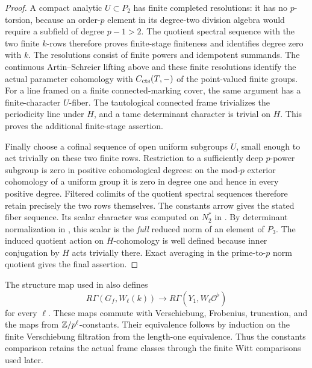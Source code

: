 \begin{proof}
A compact analytic $U\subset P_2$ has finite
completed resolutions: it has no $p$-torsion,
because an order-$p$ element in its degree-two
division algebra would require a subfield of
degree $p-1>2$.  The quotient spectral sequence
with the two finite $k$-rows therefore proves
finite-stage finiteness and identifies degree
zero with $k$.  The resolutions consist of
finite powers and idempotent summands.  The
continuous Artin--Schreier lifting above and
these finite resolutions identify the actual
parameter cohomology with $C_{\mathrm{cts}}(T,-)$ of
the point-valued finite groups.
For a line framed on a finite connected-marking
cover, the same argument has a finite-character
$U$-fiber.  The tautological connected frame
trivializes the periodicity line under $H$, and a
tame determinant character is trivial on $H$.
This proves the additional finite-stage assertion.

Finally choose a cofinal sequence of open uniform
subgroups $U$, small enough to act trivially on
these two finite rows.  Restriction to a sufficiently
deep $p$-power subgroup is zero in positive
cohomological degrees: on the mod-$p$ exterior
cohomology of a uniform group it is zero in degree
one and hence in every positive degree.  Filtered
colimits of the quotient spectral sequences
therefore retain precisely the two rows themselves.
The constants arrow gives the stated fiber
sequence.  Its scalar character was computed on
$N_2^*$ in .
By determinant normalization in
, this scalar is the
\emph{full} reduced norm of an element of $P_3$.
The induced quotient action on $H$-cohomology is
well defined because inner conjugation by $H$
acts trivially there.  Exact averaging in the
prime-to-$p$ norm quotient gives the final assertion.
\end{proof}

\begin{remark}\label{h3:ana:witt-naturality}
The structure map used in
also defines
\[
 R\Gamma(G_f,W_\ell(k))\longrightarrow
 R\Gamma(Y_1,W_\ell\mathcal O^\flat)
\]
for every $\ell$.  These maps commute with Verschiebung,
Frobenius, truncation, and the maps from
$\mathbb Z/p^\ell$-constants.  Their equivalence follows
by induction on the finite Verschiebung filtration
from the length-one equivalence.  Thus the constants
comparison retains the actual frame classes through
the finite Witt comparisons used later.
\end{remark}
